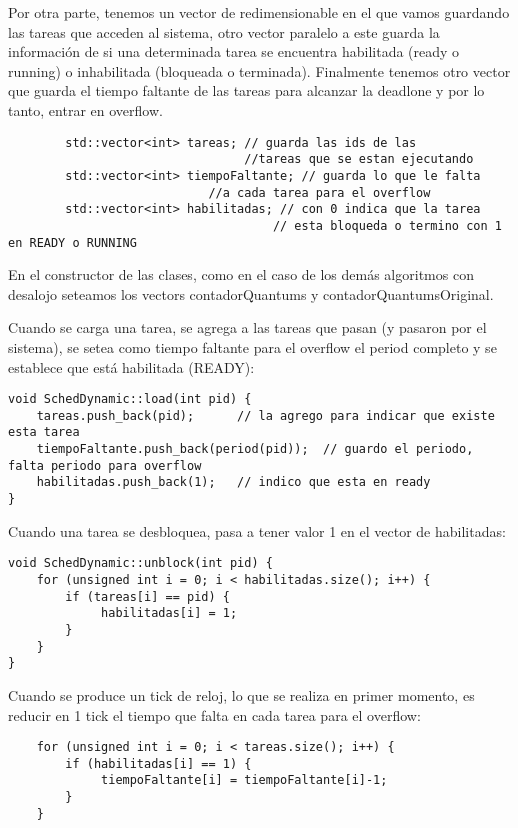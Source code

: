 Por otra parte, tenemos un vector de redimensionable en el que vamos guardando las tareas que acceden al sistema, otro vector paralelo a este guarda la informaci\'on de si una determinada tarea se encuentra habilitada (ready o running) o inhabilitada (bloqueada o terminada). Finalmente tenemos otro vector que guarda el tiempo faltante de las tareas para alcanzar la deadlone y por lo tanto, entrar en overflow.

\begin{verbatim}
        std::vector<int> tareas; // guarda las ids de las 
                                 //tareas que se estan ejecutando
        std::vector<int> tiempoFaltante; // guarda lo que le falta 
                            //a cada tarea para el overflow
        std::vector<int> habilitadas; // con 0 indica que la tarea 
                                     // esta bloqueda o termino con 1 en READY o RUNNING
\end{verbatim}

En el constructor de las clases, como en el caso de los dem\'as algoritmos con desalojo seteamos los vectors contadorQuantums y contadorQuantumsOriginal.

Cuando se carga una tarea, se agrega a las tareas que pasan (y pasaron por el sistema), se setea como tiempo faltante para el overflow el period completo y se establece que est\'a habilitada (READY):

\begin{verbatim}
void SchedDynamic::load(int pid) {
    tareas.push_back(pid);		// la agrego para indicar que existe esta tarea
    tiempoFaltante.push_back(period(pid));	// guardo el periodo, falta periodo para overflow
    habilitadas.push_back(1);	// indico que esta en ready
}
\end{verbatim}

Cuando una tarea se desbloquea, pasa a tener valor 1 en el vector de habilitadas:

\begin{verbatim}
void SchedDynamic::unblock(int pid) {
    for (unsigned int i = 0; i < habilitadas.size(); i++) { 
        if (tareas[i] == pid) {
             habilitadas[i] = 1;
        }
    }
}
\end{verbatim}

Cuando se produce un tick de reloj, lo que se realiza en primer momento, es reducir en 1 tick el tiempo que falta en cada tarea para el overflow:

\begin{verbatim}
    for (unsigned int i = 0; i < tareas.size(); i++) { 
        if (habilitadas[i] == 1) {
             tiempoFaltante[i] = tiempoFaltante[i]-1;
        }
    }
\end{verbatim}

